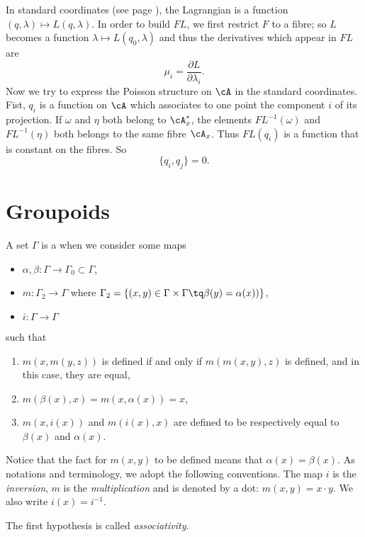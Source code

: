 In standard coordinates (see page \pageref{PgStandCoord}), the Lagrangian is a function $(q,\lambda)\mapsto L(q,\lambda)$. In order to build $FL$, we first restrict $F$ to a fibre; so $L$ becomes a function $\lambda\mapsto L(q_{0},\lambda)$ and thus the derivatives which appear in $FL$ are
\[
  \mu_{i}=\frac{ \partial L }{ \partial\lambda_{i} }.
\]
Now we try to express the Poisson structure on $\cA$ in the standard coordinates. Fist, $q_{i}$ is a  function on $\cA$ which associates to one point the component $i$ of its projection. If $\omega$ and $\eta$ both belong to $\cA^*_{x}$, the elements $FL^{-1}(\omega)$ and $FL^{-1}(\eta)$ both belongs to the same fibre $\cA_{x}$. Thus $FL(q_{i})$ is a function that is constant on the fibres. So
\[
  \{ q_{i},q_{j} \}=0.
\]





%
   \section{Groupoids}
%

A set $\Gamma$ is a  when we consider some maps
\begin{itemize}
\item $\alpha,\beta\colon \Gamma\to \Gamma_{0}\subset\Gamma$,
 \item $m\colon \Gamma_{2}\to \Gamma$ where $\Gamma_{2}=\{ (x,y)\in\Gamma\times\Gamma\tq \beta(y)=\alpha(x)) \}$,
\item $i\colon \Gamma\to \Gamma$
\end{itemize}
such that
\begin{enumerate}
\item $m(x,m(y,z))$ is defined if and only if $m(m(x,y),z)$ is defined, and in this case, they are equal,
\item $m(\beta(x),x)=m(x,\alpha(x))=x$,
  \item $m(x,i(x))$ and $m(i(x),x)$ are defined to be respectively equal to $\beta(x)$ and $\alpha(x)$.
\end{enumerate}
Notice that the fact for $m(x,y)$ to be defined means that $\alpha(x)=\beta(x)$. As notations and terminology, we adopt the following conventions. The map $i$ is the \emph{inversion}, $m$ is the \emph{multiplication} and is denoted by a dot: $m(x,y)=x\cdot y$. We also write $i(x)=i^{-1}$.

The first hypothesis is called \emph{associativity}.

